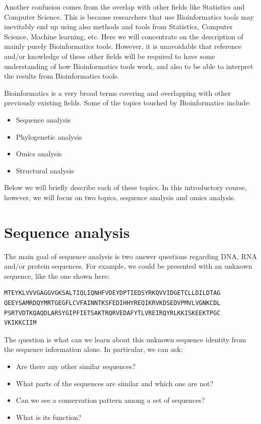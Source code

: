 \documentclass[]{book}
\providecommand{\tightlist}{%
  \setlength{\itemsep}{0pt}\setlength{\parskip}{0pt}}
\theoremstyle{definition}
\theoremstyle{definition}
\theoremstyle{definition}
\theoremstyle{remark}
\begin{document}
Another confusion comes from the overlap with other fields like
Statistics and Computer Science. This is because researchers that use
Bioinformatics tools may inevitably end up using also methods and tools
from Statistics, Computer Science, Machine learning, etc. Here we will
concentrate on the description of mainly purely Bioinformatics tools.
However, it is unavoidable that reference and/or knowledge of these
other fields will be required to have some understanding of how
Bioinformatics tools work, and also to be able to interpret the results
from Bioinformatics tools.

Bioinformatics is a very broad terms covering and overlapping with other
previously existing fields. Some of the topics touched by Bioinformatics
include:

\begin{itemize}
\tightlist
\item
  Sequence analysis
\item
  Phylogenetic analysis
\item
  Omics analysis
\item
  Structural analysis
\end{itemize}

Below we will briefly describe each of these topics. In this
introductory course, however, we will focus on two topics, sequence
analysis and omics analysis.

\section{Sequence analysis}\label{intro-sequence-analysis}

The main goal of sequence analysis is two answer questions regarding
DNA, RNA and/or protein sequences. For example, we could be presented
with an unknown sequence, like the one shown here:

\begin{verbatim}
MTEYKLVVVGAGGVGKSALTIQLIQNHFVDEYDPTIEDSYRKQVVIDGETCLLDILDTAG
QEEYSAMRDQYMRTGEGFLCVFAINNTKSFEDIHHYREQIKRVKDSEDVPMVLVGNKCDL
PSRTVDTKQAQDLARSYGIPFIETSAKTRQRVEDAFYTLVREIRQYRLKKISKEEKTPGC
VKIKKCIIM
\end{verbatim}

The question is what can we learn about this unknown sequence identity
from the sequence information alone. In particular, we can ask:

\begin{itemize}
\tightlist
\item
  Are there any other similar sequences?
\item
  What parts of the sequences are similar and which one are not?
\item
  Can we see a conservation pattern among a set of sequences?
\item
  What is its function?
\end{itemize}
\end{document}
